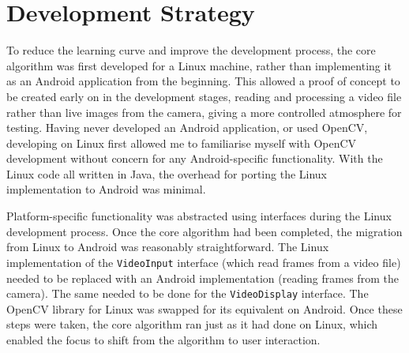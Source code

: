 \section{Development Strategy}

To reduce the learning curve and improve the development process, the core algorithm was first developed for a Linux machine, rather than implementing it as an Android application from the beginning. This allowed a proof of concept to be created early on in the development stages, reading and processing a video file rather than live images from the camera, giving a more controlled atmosphere for testing. Having never developed an Android application, or used OpenCV, developing on Linux first allowed me to familiarise myself with OpenCV development without concern for any Android-specific functionality. With the Linux code all written in Java, the overhead for porting the Linux implementation to Android was minimal.

Platform-specific functionality was abstracted using interfaces during the Linux development process. Once the core algorithm had been completed, the migration from Linux to Android was reasonably straightforward. The Linux implementation of the \texttt{VideoInput} interface (which read frames from a video file) needed to be replaced with an Android implementation (reading frames from the camera). The same needed to be done for the \texttt{VideoDisplay} interface. The OpenCV library for Linux was swapped for its equivalent on Android. Once these steps were taken, the core algorithm ran just as it had done on Linux, which enabled the focus to shift from the algorithm to user interaction.